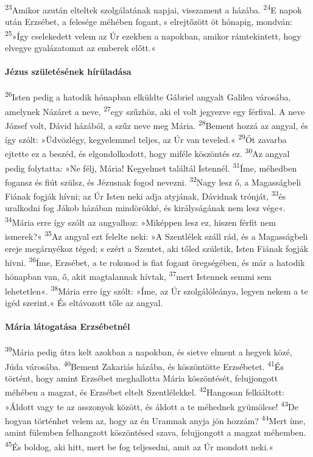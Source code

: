 \documentclass[10pt]{article}
\begin{document}
\begin{multicols}{2}
\textsuperscript{23}Amikor azután elteltek szolgálatának napjai, visszament a házába.  
\textsuperscript{24}E napok után Erzsébet, a felesége méhében fogant, s elrejtőzött öt hónapig, mondván:  
\textsuperscript{25}»Így cselekedett velem az Úr ezekben a napokban, amikor rámtekintett, hogy elvegye gyalázatomat az emberek előtt.«

\paragraph*{Jézus születésének hírüladása}
\textsuperscript{26}Isten pedig a hatodik hónapban elküldte Gábriel angyalt Galilea városába, amelynek Názáret a neve,  
\textsuperscript{27}egy szűzhöz, aki el volt jegyezve egy férfival. A neve József volt, Dávid házából, a szűz neve meg Mária.  
\textsuperscript{28}Bement hozzá az angyal, és így szólt: »Üdvözlégy, kegyelemmel teljes, az Úr van teveled.«  
\textsuperscript{29}Őt zavarba ejtette ez a beszéd, és elgondolkodott, hogy miféle köszöntés ez.  
\textsuperscript{30}Az angyal pedig folytatta: »Ne félj, Mária! Kegyelmet találtál Istennél.  
\textsuperscript{31}Íme, méhedben fogansz és fiút szülsz, és Jézusnak fogod nevezni.  
\textsuperscript{32}Nagy lesz ő, a Magasságbeli Fiának fogják hívni; az Úr Isten neki adja atyjának, Dávidnak trónját,  
\textsuperscript{33}és uralkodni fog Jákob házában mindörökké, és királyságának nem lesz vége«.  
\textsuperscript{34}Mária erre így szólt az angyalhoz: »Miképpen lesz ez, hiszen férfit nem ismerek?«  
\textsuperscript{35}Az angyal ezt felelte neki: »A Szentlélek száll rád, és a Magasságbeli ereje megárnyékoz téged; s ezért a Szentet, aki tőled születik, Isten Fiának fogják hívni.  
\textsuperscript{36}Íme, Erzsébet, a te rokonod is fiat fogant öregségében, és már a hatodik hónapban van, ő, akit magtalannak hívtak,  
\textsuperscript{37}mert Istennek semmi sem lehetetlen«.  
\textsuperscript{38}Mária erre így szólt: »Íme, az Úr szolgálóleánya, legyen nekem a te igéd szerint.« És eltávozott tőle az angyal.

 \paragraph*{Mária látogatása Erzsébetnél}
\textsuperscript{39}Mária pedig útra kelt azokban a napokban, és sietve elment a hegyek közé, Júda városába.  
\textsuperscript{40}Bement Zakariás házába, és köszöntötte Erzsébetet.  
\textsuperscript{41}És történt, hogy amint Erzsébet meghallotta Mária köszöntését, felujjongott méhében a magzat, és Erzsébet eltelt Szentlélekkel.  
\textsuperscript{42}Hangosan felkiáltott: »Áldott vagy te az asszonyok között, és áldott a te méhednek gyümölcse!  
\textsuperscript{43}De hogyan történhet velem az, hogy az én Uramnak anyja jön hozzám?  
\textsuperscript{44}Mert íme, amint fülemben felhangzott köszöntésed szava, felujjongott a magzat méhemben.  
\textsuperscript{45}És boldog, aki hitt, mert be fog teljesedni, amit az Úr mondott neki.«


\end{multicols}
\end{document}
